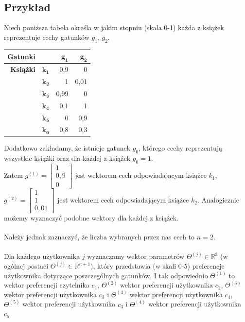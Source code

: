 \documentclass[12pt,a4paper]{report}
\begin{document}
\subsection*{Przykład}
Niech poniższa tabela określa w jakim stopniu (skala 0-1) każda z książek reprezentuje cechy gatunków $g_1$, $g_2$.
\begin{center}
\begin{tabular}{|r|r|r|r|} \hline
\textbf{Gatunki} & & $\mathbf{g_1}$ & $\mathbf{g_2}$ \\
\hline
\hline
\textbf{Książki} &$\mathbf{k_1}$ & 0,9 & 0 \\
\hline
&$\mathbf{k_2}$ & 1 & 0,01 \\
\hline
&$\mathbf{k_3}$ & 0,99 & 0 \\
\hline
&$\mathbf{k_4}$ & 0,1 & 1 \\
\hline
&$\mathbf{k_5}$ & 0 & 0,9 \\
\hline
&$\mathbf{k_6}$ & 0,8 & 0,3 \\
\hline
\end{tabular}
\end{center}
Dodatkowo zakładamy, że istnieje gatunek $g_0$, którego cechy reprezentują wszystkie książki oraz dla każdej z książek $g_0=1$.
\\Zatem $g^{(1)}= \left[
        \begin{array}{c}
         1 \\
         0,9\\
         0
         \end{array}
      \right] $ jest wektorem cech odpowiadającym książce $k_1$, $g^{(2)}= \left[
        \begin{array}{c}
         1 \\
         1\\
         0,01
         \end{array}
      \right] $ jest wektorem cech odpowiadającym książce $k_2$. Analogicznie możemy wyznaczyć podobne wektory dla każdej z książek.
\\
\\Należy jednak zaznaczyć, że liczba wybranych przez nas cech to $n=2$.
\\
\\Dla każdego użytkownika $j$ wyznaczamy wektor parametrów $\Theta^{(j)} \in \mathbb{R}^3$ (w ogólnej postaci $\Theta^{(j)} \in \mathbb{R}^{n+1})$, który przedstawia (w skali 0-5) preferencje użytkownika dotyczące poszczególnych gatunków. I tak odpowiednio $\Theta^{(1)}$ to wektor preferencji czytelnika $c_1$, $\Theta^{(2)}$ wektor preferencji użytkownika $c_2$, $\Theta^{(3)}$ wektor preferencji użytkownika $c_3$ i $\Theta^{(4)}$ wektor preferencji użytkownika $c_4$, $\Theta^{(5)}$ wektor preferencji użytkownika $c_3$ i $\Theta^{(4)}$ wektor preferencji użytkownika $c_5$
\end{document}
